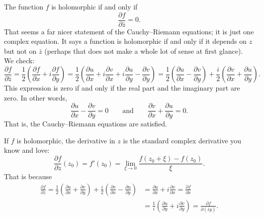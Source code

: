 \documentclass[12pt,openany]{book}
\theoremstyle{plain}
\theoremstyle{remark}
\theoremstyle{definition}
\theoremstyle{exercise}
\theoremstyle{example}
\begin{document}
The function $f$ is holomorphic if and only if
\begin{equation*}
\frac{\partial f}{\partial \bar{z}} = 0 .
\end{equation*}
That seems a far nicer statement of the Cauchy--Riemann equations; it is
just one complex equation.  It says
a function is holomorphic if and only if it depends on $z$ but not on
$\bar{z}$ (perhaps that does not make a whole lot of sense at first
glance).
We check:
\begin{equation*}
\frac{\partial f}{\partial \bar{z}}
=
\frac{1}{2}
\left(
\frac{\partial f}{\partial x} + i
\frac{\partial f}{\partial y}
\right)
=
\frac{1}{2}
\left(
\frac{\partial u}{\partial x}
+ i \frac{\partial v}{\partial x}
+ i \frac{\partial u}{\partial y}
- \frac{\partial v}{\partial y}
\right)
=
\frac{1}{2}
\left(
\frac{\partial u}{\partial x}
- \frac{\partial v}{\partial y}
\right)
+
\frac{i}{2}
\left(
\frac{\partial v}{\partial x}
+ \frac{\partial u}{\partial y}
\right) .
\end{equation*}
This expression is zero if and only if the real part and the imaginary
part are zero.  In other words,
\begin{equation*}
\frac{\partial u}{\partial x}
- \frac{\partial v}{\partial y}
= 0
\qquad
\text{and}
\qquad
\frac{\partial v}{\partial x}
+ \frac{\partial u}{\partial y} = 0
.
\end{equation*}
That is, the Cauchy--Riemann equations are satisfied.

If $f$ is holomorphic, the derivative in $z$ is the standard complex derivative you know and love:
\begin{equation*}
\frac{\partial f}{\partial z} (z_0)
=
f'(z_0)
=
\lim_{\xi \to 0} \frac{f(z_0+\xi)-f(z_0)}{\xi} .
\end{equation*}
That is because
\begin{equation*}
\begin{split}
\frac{\partial f}{\partial z}
=
\frac{1}{2}
\left(
\frac{\partial u}{\partial x}
+ \frac{\partial v}{\partial y}
\right)
+
\frac{i}{2}
\left( \frac{\partial v}{\partial x} - \frac{\partial u}{\partial y}
\right)
& =
\frac{\partial u}{\partial x}
+ i \frac{\partial v}{\partial x}
 =
\frac{\partial f}{\partial x}
\\
& =
\frac{1}{i} \left(
\frac{\partial u}{\partial y}
+ i
\frac{\partial v}{\partial y}
\right)
 =
\frac{\partial f}{\partial (iy)}
.
\end{split}
\end{equation*}
\end{document}
